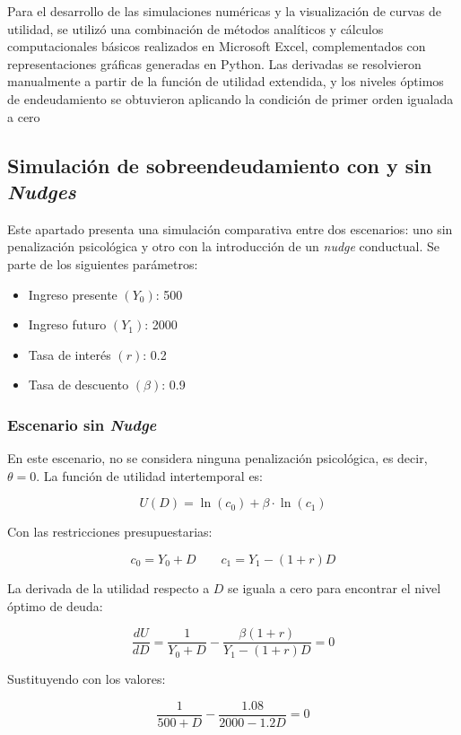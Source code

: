 \documentclass[10pt]{article}
\begin{document}
\begin{multicols}{2}
Para el desarrollo de las simulaciones numéricas y la visualización de curvas de utilidad, se utilizó una combinación de métodos analíticos y cálculos computacionales básicos realizados en Microsoft Excel, complementados con representaciones gráficas generadas en Python. Las derivadas se resolvieron manualmente a partir de la función de utilidad extendida, y los niveles óptimos de endeudamiento se obtuvieron aplicando la condición de primer orden igualada a cero


\subsection{Simulación de sobreendeudamiento con y sin \textit{Nudges}}

Este apartado presenta una simulación comparativa entre dos escenarios: uno sin penalización psicológica y otro con la introducción de un \textit{nudge} conductual. Se parte de los siguientes parámetros:

\begin{itemize}
    \item Ingreso presente $(Y_0)$: 500
    \item Ingreso futuro $(Y_1)$: 2000
    \item Tasa de interés $(r)$: 0.2
    \item Tasa de descuento $(\beta)$: 0.9
\end{itemize}

\subsubsection*{Escenario sin \textit{Nudge}}

En este escenario, no se considera ninguna penalización psicológica, es decir, $\theta = 0$. La función de utilidad intertemporal es:

\[
U(D) = \ln(c_0) + \beta \cdot \ln(c_1)
\]

Con las restricciones presupuestarias:

\[
c_0 = Y_0 + D \qquad c_1 = Y_1 - (1 + r)D
\]

La derivada de la utilidad respecto a $D$ se iguala a cero para encontrar el nivel óptimo de deuda:

\[
\frac{dU}{dD} = \frac{1}{Y_0 + D} - \frac{\beta (1 + r)}{Y_1 - (1 + r)D} = 0
\]

Sustituyendo con los valores:

\[
\frac{1}{500 + D} - \frac{1.08}{2000 - 1.2D} = 0
\]


\end{multicols}
\end{document}
